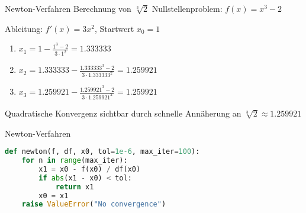\begin{example2}{Newton-Verfahren} Berechnung von $\sqrt[3]{2}$
Nullstellenproblem: $f(x)=x^3-2$
\vspace{1mm}\\
\begin{minipage}[t]{0.65\textwidth}
    \vspace{-3mm}
    Ableitung: $f'(x)=3x^2$, Startwert $x_0=1$
    \begin{enumerate}
        \item $x_1 = 1 - \frac{1^3-2}{3 \cdot 1^2} = 1.333333$
        \item $x_2 = 1.333333 - \frac{1.333333^3-2}{3 \cdot 1.333333^2} = 1.259921$
        \item $x_3 = 1.259921 - \frac{1.259921^3-2}{3 \cdot 1.259921^2} = 1.259921$
    \end{enumerate}
\end{minipage}
\begin{minipage}[t]{0.3\textwidth}
    Quadratische Konvergenz sichtbar durch schnelle Annäherung an $\sqrt[3]{2} \approx 1.259921$
\end{minipage}
\end{example2}

\begin{examplecode}{Newton-Verfahren}
    \begin{lstlisting}[language=Python, style=basesmol]
def newton(f, df, x0, tol=1e-6, max_iter=100):
    for n in range(max_iter):
        x1 = x0 - f(x0) / df(x0)
        if abs(x1 - x0) < tol:
            return x1
        x0 = x1
    raise ValueError("No convergence")
    \end{lstlisting}
\end{examplecode}

